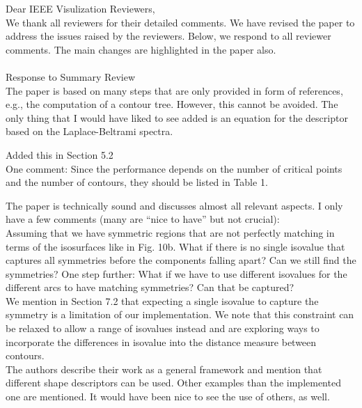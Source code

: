 \documentclass[10pt]{article}
\title{}
\date{}
\begin{document}
\noindent Dear IEEE Visulization Reviewers,\\

We thank all reviewers for their detailed comments. We have revised the paper to address the issues raised by the reviewers.
Below, we respond to all reviewer comments. The main changes are highlighted in the paper also.\\\\

{\noindent \LARGE Response to Summary Review}\\

The paper is based on many steps that are only provided in form of
   references, e.g., the computation of a contour tree. However, this cannot
   be avoided. The only thing that I would have liked to see added is an
   equation for the descriptor based on the Laplace-Beltrami spectra.

   {\color{blue}Added this in Section 5.2}\\

   One comment:
   Since the performance depends on the number of critical points and the
   number of contours, they should be listed in Table 1.

   The paper is technically sound and discusses almost all relevant aspects.
   I only have a few comments (many are ``nice to have'' but not crucial):\\

   Assuming that we have symmetric regions that are not perfectly matching
   in terms of the isosurfaces like in Fig. 10b. What if there is no single
   isovalue that captures all symmetries before the components falling
   apart? Can we still find the symmetries? One step further: What if we
   have to use different isovalues for the different arcs to have matching
   symmetries? Can that be captured?\\
   {\color{blue}We mention in Section 7.2 that expecting a single isovalue
	to capture the symmetry is a limitation of our
	   implementation. We note that this constraint can be relaxed to allow
	   a range of isovalues instead and are exploring ways to incorporate
   the differences in isovalue into the distance measure between contours.}\\
   
   The authors describe their work as a general framework and mention that
   different shape descriptors can be used. Other examples than the
   implemented one are mentioned. It would have been nice to see the use of
   others, as well. 
\end{document}
